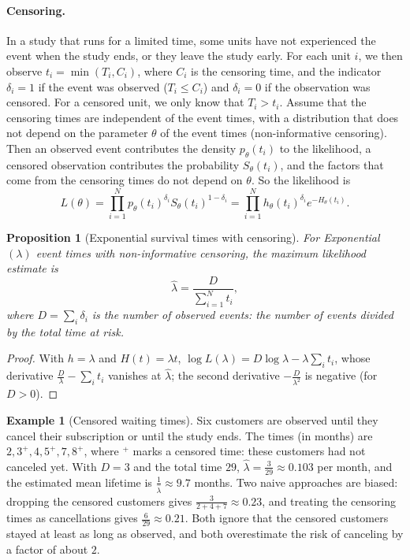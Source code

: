 \documentclass[11pt]{article}
\theoremstyle{definition}
\newtheorem{example}[definition]{Example}
\theoremstyle{plain}
\newtheorem{proposition}[definition]{Proposition}
\theoremstyle{remark}
\begin{document}
\paragraph{Censoring.} In a study that runs for a limited time, some units have not experienced the event when the study ends, or they leave the study early. For each unit $i$, we then observe $t_i = \min(T_i, C_i)$, where $C_i$ is the censoring time, and the indicator $\delta_i = 1$ if the event was observed ($T_i \leq C_i$) and $\delta_i = 0$ if the observation was censored. For a censored unit, we only know that $T_i > t_i$. Assume that the censoring times are independent of the event times, with a distribution that does not depend on the parameter $\theta$ of the event times (non-informative censoring). Then an observed event contributes the density $p_\theta(t_i)$ to the likelihood, a censored observation contributes the probability $S_\theta(t_i)$, and the factors that come from the censoring times do not depend on $\theta$. So the likelihood is
\[L(\theta) = \prod_{i=1}^N p_\theta(t_i)^{\delta_i}S_\theta(t_i)^{1 - \delta_i} = \prod_{i=1}^N h_\theta(t_i)^{\delta_i}e^{-H_\theta(t_i)}.\]

\begin{proposition}[Exponential survival times with censoring]\label{prop:censored-mle}
    For Exponential$(\lambda)$ event times with non-informative censoring, the maximum likelihood estimate is
    \[\hat\lambda = \frac{D}{\sum_{i=1}^N t_i},\]
    where $D = \sum_i \delta_i$ is the number of observed events: the number of events divided by the total time at risk.
\end{proposition}

\begin{proof}
    With $h = \lambda$ and $H(t) = \lambda t$, $\log L(\lambda) = D\log\lambda - \lambda\sum_i t_i$, whose derivative $\frac{D}{\lambda} - \sum_i t_i$ vanishes at $\hat\lambda$; the second derivative $-\frac{D}{\lambda^2}$ is negative (for $D > 0$).
\end{proof}

\begin{example}[Censored waiting times]\label{ex:censored}
    Six customers are observed until they cancel their subscription or until the study ends. The times (in months) are $2, 3^+, 4, 5^+, 7, 8^+$, where $^+$ marks a censored time: these customers had not canceled yet. With $D = 3$ and the total time $29$, $\hat\lambda = \frac{3}{29} \approx 0.103$ per month, and the estimated mean lifetime is $\frac{1}{\hat\lambda} \approx 9.7$ months. Two naive approaches are biased: dropping the censored customers gives $\frac{3}{2 + 4 + 7} \approx 0.23$, and treating the censoring times as cancellations gives $\frac{6}{29} \approx 0.21$. Both ignore that the censored customers stayed at least as long as observed, and both overestimate the risk of canceling by a factor of about $2$.
\end{example}
\end{document}
